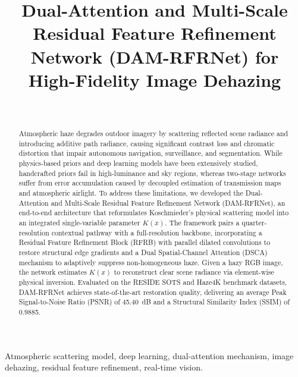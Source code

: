 \documentclass[journal]{IEEEtran}
\begin{document}
\title{Dual-Attention and Multi-Scale Residual Feature Refinement Network (DAM-RFRNet) for High-Fidelity Image Dehazing}

\author{
    \\
}

\maketitle

\begin{abstract}
Atmospheric haze degrades outdoor imagery by scattering reflected scene radiance and introducing additive path radiance, causing significant contrast loss and chromatic distortion that impair autonomous navigation, surveillance, and segmentation. While physics-based priors and deep learning models have been extensively studied, handcrafted priors fail in high-luminance and sky regions, whereas two-stage networks suffer from error accumulation caused by decoupled estimation of transmission maps and atmospheric airlight. To address these limitations, we developed the Dual-Attention and Multi-Scale Residual Feature Refinement Network (DAM-RFRNet), an end-to-end architecture that reformulates Koschmieder's physical scattering model into an integrated single-variable parameter $K(x)$. The framework pairs a quarter-resolution contextual pathway with a full-resolution backbone, incorporating a Residual Feature Refinement Block (RFRB) with parallel dilated convolutions to restore structural edge gradients and a Dual Spatial-Channel Attention (DSCA) mechanism to adaptively suppress non-homogeneous haze. Given a hazy RGB image, the network estimates $K(x)$ to reconstruct clear scene radiance via element-wise physical inversion. Evaluated on the RESIDE SOTS and Haze4K benchmark datasets, DAM-RFRNet achieves state-of-the-art restoration quality, delivering an average Peak Signal-to-Noise Ratio (PSNR) of 45.40~dB and a Structural Similarity Index (SSIM) of 0.9885.
\end{abstract}

\begin{IEEEkeywords}
Atmospheric scattering model, deep learning, dual-attention mechanism, image dehazing, residual feature refinement, real-time vision.
\end{IEEEkeywords}
\end{document}
